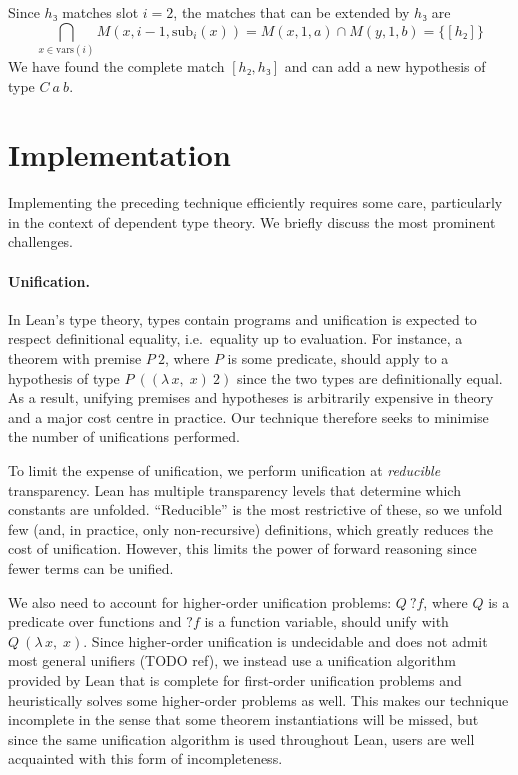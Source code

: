 \documentclass[runningheads]{llncs}
\newcommand{\Lam}[2]{\ensuremath{\lambda\, #1,\; #2}}
\newcommand{\mvar}[1]{\ensuremath{?#1}}
\newcommand{\vars}{\ensuremath{\mathrm{vars}}}
\newcommand{\sub}{\ensuremath{\mathrm{sub}}}
\begin{document}
Since $h₃$ matches slot $i = 2$, the matches that can be extended by $h₃$ are
\[
  \bigcap_{x \in \vars(i)} M(x, i - 1, \sub_{i}(x)) = M(x, 1, a) \cap M(y, 1, b) = \{[h₂]\}
\]
We have found the complete match $[h₂, h₃]$ and can add a new hypothesis of type $C~a~b$.

\section{Implementation}%
\label{sec:implementation}

Implementing the preceding technique efficiently requires some care, particularly in the context of dependent type theory.
We briefly discuss the most prominent challenges.

\paragraph{Unification.}
In Lean's type theory, types contain programs and unification is expected to respect definitional equality, i.e.\ equality up to evaluation.
For instance, a theorem with premise $P~2$, where $P$ is some predicate, should apply to a hypothesis of type $P~((\Lam{x}{x})~2)$ since the two types are definitionally equal.
As a result, unifying premises and hypotheses is arbitrarily expensive in theory and a major cost centre in practice.
Our technique therefore seeks to minimise the number of unifications performed.

To limit the expense of unification, we perform unification at \emph{reducible} transparency.
Lean has multiple transparency levels that determine which constants are unfolded.
\enquote{Reducible} is the most restrictive of these, so we unfold few (and, in practice, only non-recursive) definitions, which greatly reduces the cost of unification.
However, this limits the power of forward reasoning since fewer terms can be unified.

We also need to account for higher-order unification problems: $Q~\mvar{f}$, where $Q$ is a predicate over functions and $\mvar{f}$ is a function variable, should unify with $Q~(\Lam{x}{x})$.
Since higher-order unification is undecidable and does not admit most general unifiers (TODO ref), we instead use a unification algorithm provided by Lean that is complete for first-order unification problems and heuristically solves some higher-order problems as well.
This makes our technique incomplete in the sense that some theorem instantiations will be missed, but since the same unification algorithm is used throughout Lean, users are well acquainted with this form of incompleteness.
\end{document}
